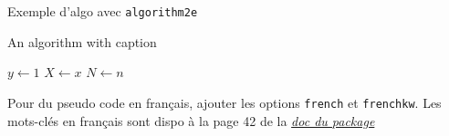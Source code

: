 \documentclass{umonsreport}
\begin{document}
Exemple d'algo avec \verb|algorithm2e|\\


\begin{algorithm}[H]
\caption{An algorithm with caption}\label{alg:two}
$y \gets 1$\;
$X \gets x$\;
$N \gets n$\;
\end{algorithm}
Pour du pseudo code en français, ajouter les options \verb|french| et \verb|frenchkw|. Les mots-clés en français sont dispo à la page 42 de la \href{https://tug.ctan.org/macros/latex/contrib/algorithm2e/doc/algorithm2e.pdf}{\textit{doc du package}}
\end{document}

